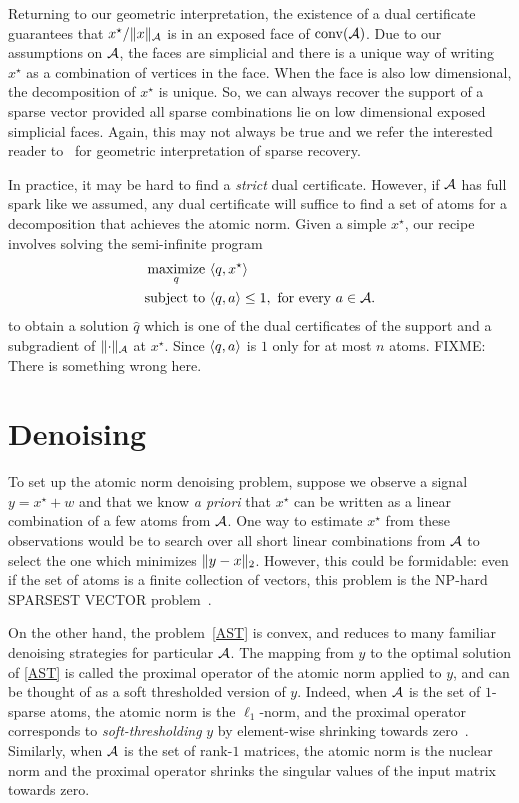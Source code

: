 Returning to our geometric interpretation, the existence of a dual certificate
guarantees that $x^\star/\lVert x\rVert_{\mathcal{A}}$ is in an exposed face of $\operatorname{conv}(\mathcal{A})$. Due
to our assumptions on $\mathcal{A}$, the faces are simplicial and there is a unique way
of writing $x^\star$ as a combination of vertices in the face. When the face is
also low dimensional, the decomposition of $x^\star$ is unique. So, we can
always recover the support of a sparse vector provided all sparse combinations
lie on low dimensional exposed simplicial faces. Again, this may not always be
true and we refer the interested reader to~\cite{neighborliness} for geometric
interpretation of sparse recovery.

In practice, it may be hard to find a \emph{strict} dual certificate. However,
if $\mathcal{A}$ has full spark like we assumed, any dual certificate will suffice to
find a set of atoms for a decomposition that achieves the atomic norm. Given a simple $x^\star$, our recipe involves solving the semi-infinite program
\begin{equation}
\label{eq:ast:dual:support}
\begin{split}
	\mathop{\operatorname{maximize}}_q~ & \langle q, x^\star\rangle\\
	\text{subject to } & \langle q, a\rangle \leq 1, \text{ for every } a \in \mathcal{A}.
\end{split}
\end{equation}
to obtain a solution $\hat{q}$ which is one of the dual certificates of the
support and a subgradient of $\lVert\cdot\rVert_{\mathcal{A}}$ at $x^\star$. Since $\langle q, a\rangle$ is $1$ only for at most $n$ atoms. FIXME: There is something wrong here. 

\section{Denoising}
\label{sec:abstract-denoising}

To set up the atomic norm denoising problem, suppose we observe a signal $y =
x^\star + w$ and that we know \emph{a priori} that $x^\star$ can be written as a
linear combination of a few atoms from $\mathcal{A}$. One way to estimate $x^\star$ from
these observations would be to search over all short linear combinations from
$\mathcal{A}$ to select the one which minimizes $\lVert y- x\rVert_2$. However, this could be
formidable: even if the set of atoms is a finite collection of vectors, this
problem is the NP-hard SPARSEST VECTOR problem~\cite{Natarajan95}.

On the other hand, the problem~\eqref{AST} is convex, and reduces to many
familiar denoising strategies for particular $\mathcal{A}$. The mapping from $y$ to the
optimal solution of \eqref{AST} is called the proximal operator of the atomic
norm applied to $y$, and can be thought of as a soft thresholded version of $y$.
Indeed, when $\mathcal{A}$ is the set of $1$-sparse atoms, the atomic norm is the
$\ell_1$-norm, and the proximal operator corresponds to \emph{soft-thresholding}
$y$ by element-wise shrinking towards zero~\cite{donoho1995noising}. Similarly,
when $\mathcal{A}$ is the set of rank-$1$ matrices, the atomic norm is the nuclear norm
and the proximal operator shrinks the singular values of the input matrix
towards zero.

